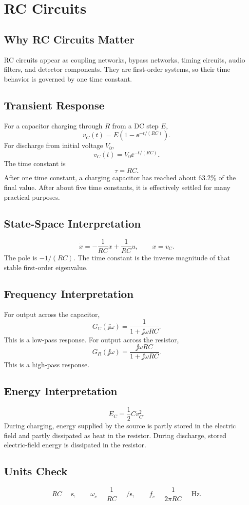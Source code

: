 \chapter{RC Circuits}
\section{Why RC Circuits Matter}
RC circuits appear as coupling networks, bypass networks, timing circuits, audio
filters, and detector components. They are first-order systems, so their time
behavior is governed by one time constant.

\section{Transient Response}
For a capacitor charging through \(R\) from a DC step \(E\),
\[
v_C(t)=E\left(1-\ee^{-t/(RC)}\right).
\]
For discharge from initial voltage \(V_0\),
\[
v_C(t)=V_0\ee^{-t/(RC)}.
\]
The time constant is
\[
\tau=RC.
\]
After one time constant, a charging capacitor has reached about \(63.2\%\) of
the final value. After about five time constants, it is effectively settled for
many practical purposes.

\section{State-Space Interpretation}
\[
\dot{x}=-\frac{1}{RC}x+\frac{1}{RC}u,
\qquad
x=v_C.
\]
The pole is \(-1/(RC)\). The time constant is the inverse magnitude of that
stable first-order eigenvalue.

\section{Frequency Interpretation}
For output across the capacitor,
\[
G_C(\jj\omega)=\frac{1}{1+\jj\omega RC}.
\]
This is a low-pass response. For output across the resistor,
\[
G_R(\jj\omega)=\frac{\jj\omega RC}{1+\jj\omega RC}.
\]
This is a high-pass response.

\section{Energy Interpretation}
\[
E_C=\frac{1}{2}Cv_C^2.
\]
During charging, energy supplied by the source is partly stored in the electric
field and partly dissipated as heat in the resistor. During discharge, stored
electric-field energy is dissipated in the resistor.

\section{Units Check}
\begin{unitsbox}
\[
RC=\si{\second},
\qquad
\omega_c=\frac{1}{RC}=\si{\per\second},
\qquad
f_c=\frac{1}{2\pi RC}=\si{\hertz}.
\]
\end{unitsbox}

